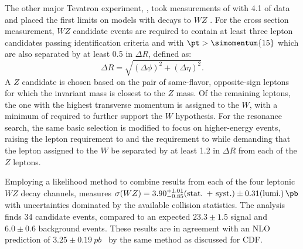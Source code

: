 The other major Tevatron experiment, \dzero, took measurements of \wztolnll with \SI{4.1}{\fbinv} of data~\cite{D0:2010qn} and placed the first limits on \wprime models with decays to $WZ$ \cite{D0:2009eu}.
For the cross section measurement, $WZ$ candidate events are required to contain at least three lepton candidates passing identification criteria and with $\pt > \simomentum{15}$ which are also separated by at least 0.5 in $\Delta R$, defined as:
\begin{equation}
  \label{eq:deltar}
  \Delta R = \sqrt{(\Delta\phi)^2 + (\Delta\eta)^2}.
\end{equation}
A $Z$ candidate is chosen based on the pair of same-flavor, opposite-sign leptons for which the invariant mass is closest to the $Z$ mass.  Of the remaining leptons, the one with the highest transverse momentum is assigned to the $W$, with a minimum \MET of  required to further support the $W$ hypothesis.  For the resonance search, the same basic selection is modified to focus on higher-energy events, raising the lepton \pt requirement to  and the \MET requirement to  while demanding that the lepton assigned to the $W$ be separated by at least 1.2 in $\Delta R$ from each of the $Z$ leptons.

Employing a likelihood method to combine results from each of the four leptonic $WZ$ decay channels, \dzero measures $\sigma(WZ) = 3.90^{+1.01}_{-0.85} \text{(stat. + syst.)} \pm 0.31 \text{(lumi.)}\,\pb$ with uncertainties dominated by the available collision statistics.  The analysis finds 34 candidate events, compared to an expected $23.3 \pm 1.5$ signal and $6.0 \pm 0.6$ background events.  These results are in agreement with an NLO prediction of $3.25 \pm \SI{0.19}{pb}$~\cite{Campbell:1999ah} by the same method as discussed for CDF.

